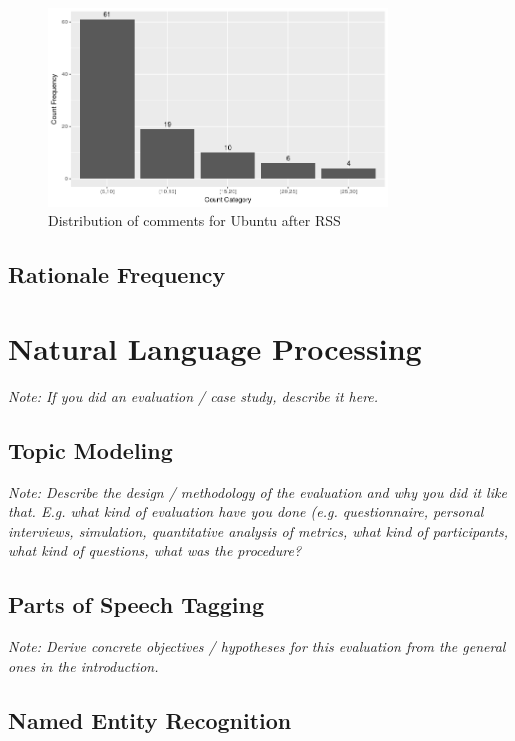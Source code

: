 \documentclass[a4paper,12pt,twoside]{report}
\begin{document}
\begin{figure}[h] %
    \centering
    \includegraphics[width=9cm]{ubuntu-comment-distribution-rss}
    \caption{Distribution of comments for Ubuntu after RSS}
    \label{fig:ubuntuRSSDistro}
\end{figure}

\section{Rationale Frequency}


\chapter{Natural Language Processing}

\textit{Note: If you did an evaluation / case study, describe it here.}

\section{Topic Modeling}

\textit{Note: Describe the design / methodology of the evaluation and why you did it like that. E.g. what kind of evaluation have you done (e.g. questionnaire, personal interviews, simulation, quantitative analysis of metrics, what kind of participants, what kind of questions, what was the procedure?}

\section{Parts of Speech Tagging}

\textit{Note: Derive concrete objectives / hypotheses for this evaluation from the general ones in the introduction.}

\section{Named Entity Recognition}
\end{document}
